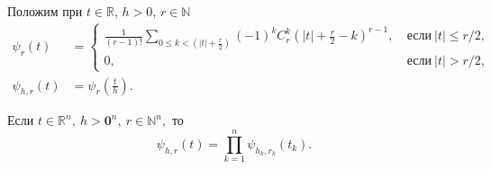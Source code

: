 
Положим при $t\in\mathbb{R}$, $h>0$, $r\in\mathbb{N}$
\begin{align*}
  \psi_r(t)&=
  \begin{cases}
    \frac{1}{(r-1)!}\sum\limits_{0\leqslant k<\left(|t|+\frac{r}{2}\right)}(-1)^kC_r^k\left(|t|+\frac{r}{2}-k\right)^{r-1},
    &\ \text{если}\ |t|\leqslant r/2,\\
    0,&\ \text{если}\ |t| > r/2,
  \end{cases}\\
  \psi_{h,r}(t)&=\psi_r\left(\frac{t}{h}\right).
\end{align*}

Если $t\in\mathbb{R}^n,\  h>\mathbf{0}^n,\ r\in\mathbb{N}^n,$ то
\begin{equation*}
  \psi_{h,r}(t)=\prod_{k=1}^n\psi_{h_k,r_k}(t_k).
\end{equation*}




